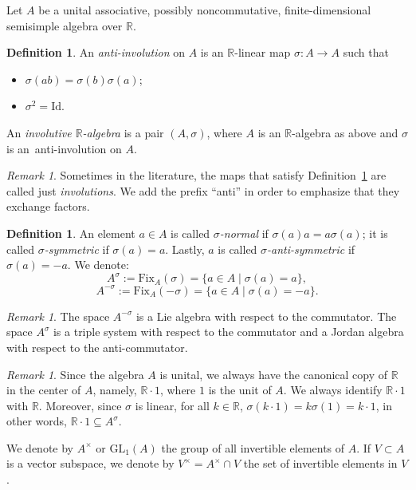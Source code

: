 \documentclass[oneside,11pt]{amsart}
\theoremstyle{definition}
\newtheorem{defn}[thm]{Definition}
\theoremstyle{remark}
\newtheorem{rem}[thm]{Remark}
\numberwithin{thm}{section}
\numberwithin{equation}{section}
\begin{document}
Let $A$ be a unital associative, possibly noncommutative, finite-dimensional semisimple algebra over $\mathbb{R}$.

\begin{defn}\label{def:antiinv}
An \emph{anti-involution} on $A$ is an $\mathbb{R}$-linear map $\sigma\colon A\to A$ such that
\begin{itemize}
\item $\sigma(ab)=\sigma(b)\sigma(a)$;
\item $\sigma^2=\mathrm{Id}$.
\end{itemize}
An \emph{involutive $\mathbb{R}$-algebra} is a pair $(A,\sigma)$, where $A$ is an $\mathbb{R}$-algebra as above and $\sigma$ is an~anti-involution on $A$.
\end{defn}

\begin{rem}
Sometimes in the literature, the maps that satisfy Definition~\ref{def:antiinv} are called just \emph{involutions}. We add the prefix ``anti'' in order to emphasize that they exchange factors.
\end{rem}

\begin{defn} An element $a\in A$ is called \emph{$\sigma$-normal} if $\sigma(a)a=a\sigma(a)$; it is called \emph{$\sigma$-symmetric} if $\sigma(a)=a$. Lastly, $a$ is called \emph{$\sigma$-anti-symmetric} if $\sigma(a)=-a$. We denote:
$$A^{\sigma}:=\mathrm{Fix}_A(\sigma)=\{a\in A\mid \sigma(a)=a\},$$
$$A^{-\sigma}:=\mathrm{Fix}_A(-\sigma)=\{a\in A\mid \sigma(a)=-a\}.$$
\end{defn}

\begin{rem}
    The space $A^{-\sigma}$ is a Lie algebra with respect to the commutator. The space $A^{\sigma}$ is a triple system with respect to the commutator and a Jordan algebra with respect to the anti-commutator.
\end{rem}

\begin{rem}
Since the algebra $A$ is unital, we always have the canonical copy of $\mathbb{R}$ in the center of $A$, namely, $\mathbb{R}\cdot 1$, where $1$ is the unit of $A$. We always identify $\mathbb{R}\cdot 1$ with $\mathbb{R}$. Moreover, since $\sigma$ is linear, for all $k\in \mathbb{R}$, $\sigma(k\cdot 1)=k\sigma(1)=k\cdot 1$, in other words, $\mathbb{R}\cdot 1\subseteq A^\sigma$.
\end{rem}

We denote by $A^\times$ or $\mathrm{GL}_1(A)$ the group of all invertible elements of $A$. If $V \subset A$ is a vector subspace, we denote by $V^\times = A^\times \cap V$
the set of invertible elements in $V$.
\end{document}
